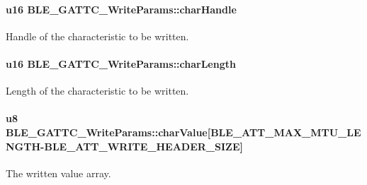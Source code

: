 \paragraph[{\texorpdfstring{char\+Handle}{charHandle}}]{\setlength{\rightskip}{0pt plus 5cm}u16 B\+L\+E\+\_\+\+G\+A\+T\+T\+C\+\_\+\+Write\+Params\+::char\+Handle}\hypertarget{struct_b_l_e___g_a_t_t_c___write_params_a293a46eab3ac35723d8106aefa34e001}{}\label{struct_b_l_e___g_a_t_t_c___write_params_a293a46eab3ac35723d8106aefa34e001}
Handle of the characteristic to be written. 
\paragraph[{\texorpdfstring{char\+Length}{charLength}}]{\setlength{\rightskip}{0pt plus 5cm}u16 B\+L\+E\+\_\+\+G\+A\+T\+T\+C\+\_\+\+Write\+Params\+::char\+Length}\hypertarget{struct_b_l_e___g_a_t_t_c___write_params_ac34bdb23d802323b6e6b700a8bc375e0}{}\label{struct_b_l_e___g_a_t_t_c___write_params_ac34bdb23d802323b6e6b700a8bc375e0}
Length of the characteristic to be written. 
\paragraph[{\texorpdfstring{char\+Value}{charValue}}]{\setlength{\rightskip}{0pt plus 5cm}u8 B\+L\+E\+\_\+\+G\+A\+T\+T\+C\+\_\+\+Write\+Params\+::char\+Value\mbox{[}{\bf B\+L\+E\+\_\+\+A\+T\+T\+\_\+\+M\+A\+X\+\_\+\+M\+T\+U\+\_\+\+L\+E\+N\+G\+TH}-\/{\bf B\+L\+E\+\_\+\+A\+T\+T\+\_\+\+W\+R\+I\+T\+E\+\_\+\+H\+E\+A\+D\+E\+R\+\_\+\+S\+I\+ZE}\mbox{]}}\hypertarget{struct_b_l_e___g_a_t_t_c___write_params_ab31b91ce2e480a2adc11a37abc50f6e4}{}\label{struct_b_l_e___g_a_t_t_c___write_params_ab31b91ce2e480a2adc11a37abc50f6e4}
The written value array. 
